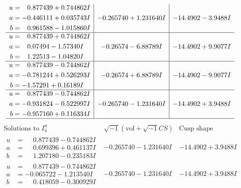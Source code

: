 \documentclass[1p]{elsarticle_modified}
\theoremstyle{definition}
\newcommand{\I}{\sqrt{-1}}
\begin{document}
$$\begin{array}{c|c|c}
\begin{aligned}
u &= \phantom{-}0.877439 + 0.744862 I \\
a &= -0.446111 + 0.035743 I \\
b &= \phantom{-}0.961588 - 1.015860 I\end{aligned}
 & -0.265740 + 1.231640 I & -14.4902 - 3.9488 I \\ \hline\begin{aligned}
u &= \phantom{-}0.877439 + 0.744862 I \\
a &= \phantom{-}0.07494 - 1.57340 I \\
b &= \phantom{-}1.22513 - 1.04820 I\end{aligned}
 & -0.26574 - 6.88789 I & -14.4902 + 9.9077 I \\ \hline\begin{aligned}
u &= \phantom{-}0.877439 - 0.744862 I \\
a &= -0.781244 + 0.526293 I \\
b &= -1.57291 + 0.16189 I\end{aligned}
 & -0.26574 + 6.88789 I & -14.4902 - 9.9077 I \\ \hline\begin{aligned}
u &= \phantom{-}0.877439 - 0.744862 I \\
a &= -0.931824 - 0.522997 I \\
b &= -0.957160 + 0.116334 I\end{aligned}
 & -0.265740 - 1.231640 I & -14.4902 + 3.9488 I\\
 \hline 
 \end{array}$$\newpage$$\begin{array}{c|c|c}  
\text{Solutions to }I^u_{4}& \I (\text{vol} + \sqrt{-1}CS) & \text{Cusp shape}\\
 \hline 
\begin{aligned}
u &= \phantom{-}0.877439 - 0.744862 I \\
a &= \phantom{-}0.699396 + 0.461137 I \\
b &= \phantom{-}1.207180 - 0.235183 I\end{aligned}
 & -0.265740 - 1.231640 I & -14.4902 + 3.9488 I \\ \hline\begin{aligned}
u &= \phantom{-}0.877439 - 0.744862 I \\
a &= -0.065722 - 1.213540 I \\
b &= \phantom{-}0.418059 - 0.300929 I\end{aligned}
 & -0.265740 - 1.231640 I & -14.4902 + 3.9488 I \\ \hline\begin{aligned}

\end{aligned}
\end{array}$$
\end{document}
